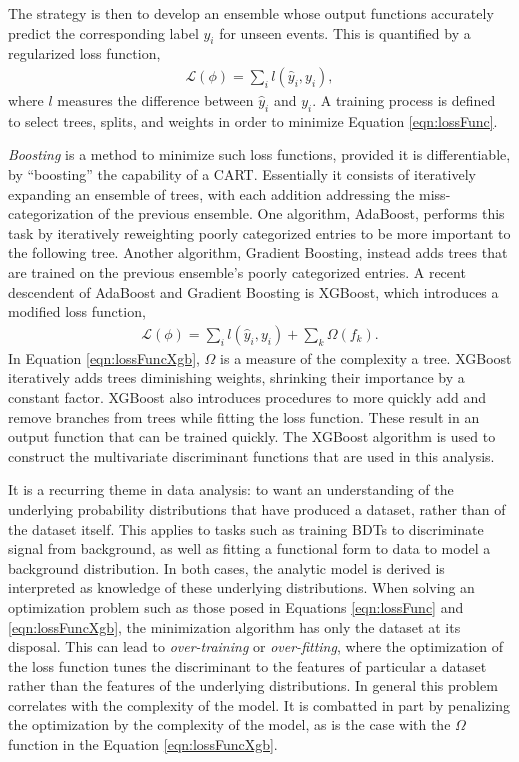 The strategy is then to develop an ensemble whose output functions accurately predict the corresponding label $y_i$ for unseen events.
This is quantified by a regularized loss function,
\begin{equation}\begin{split}\label{eqn:lossFunc}
    \mathcal{L}(\phi)=\sum_i l(\hat{y}_i,y_i),
\end{split}\end{equation} 
where $l$ measures the difference between $\hat{y}_i$ and $y_i$.
A training process is defined to select trees, splits, and weights in order to minimize Equation \ref{eqn:lossFunc}.

\emph{Boosting} is a method to minimize such loss functions, provided it is differentiable, by ``boosting'' the capability of a CART.
Essentially it consists of iteratively expanding an ensemble of trees, with each addition addressing the miss-categorization of the previous ensemble.
One algorithm, AdaBoost, performs this task by iteratively reweighting poorly categorized entries to be more important to the following tree.
Another algorithm, Gradient Boosting, instead adds trees that are trained on the previous ensemble's poorly categorized entries.
A recent descendent of AdaBoost and Gradient Boosting is XGBoost, which introduces a modified loss function,
\begin{equation}\begin{split}\label{eqn:lossFuncXgb}
    \mathcal{L}(\phi)=\sum_i l(\hat{y}_i,y_i)+\sum_k \Omega(f_k).
\end{split}\end{equation} 
In Equation \ref{eqn:lossFuncXgb}, $\Omega$ is a measure of the complexity a tree.
XGBoost iteratively adds trees diminishing weights, shrinking their importance by a constant factor.
XGBoost also introduces procedures to more quickly add and remove branches from trees while fitting the loss function.
These result in an output function that can be trained quickly.
The XGBoost algorithm is used to construct the multivariate discriminant functions that are used in this analysis.
\cite{xgboost}

It is a recurring theme in data analysis: to want an understanding of the underlying probability distributions that have produced a dataset, rather than of the dataset itself.
This applies to tasks such as training BDTs to discriminate signal from background, as well as fitting a functional form to data to model a background distribution. 
In both cases, the analytic model is derived is interpreted as knowledge of these underlying distributions.
When solving an optimization problem such as those posed in Equations \ref{eqn:lossFunc} and \ref{eqn:lossFuncXgb}, the minimization algorithm has only the dataset at its disposal.
This can lead to \emph{over-training} or \emph{over-fitting}, where the optimization of the loss function tunes the discriminant to the features of particular a dataset rather than the features of the underlying distributions.
In general this problem correlates with the complexity of the model.
It is combatted in part by penalizing the optimization by the complexity of the model, as is the case with the $\Omega$ function in the Equation \ref{eqn:lossFuncXgb}.

